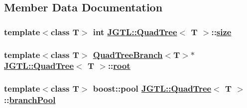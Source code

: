 \subsection{Member Data Documentation}
\hypertarget{class_j_g_t_l_1_1_quad_tree_2e563e76183a1561d6113521465bab13}{
\subsubsection[size]{\setlength{\rightskip}{0pt plus 5cm}template$<$class T$>$ int \hyperlink{class_j_g_t_l_1_1_quad_tree}{JGTL::Quad\-Tree}$<$ T $>$::\hyperlink{class_j_g_t_l_1_1_quad_tree_2e563e76183a1561d6113521465bab13}{size}}}
\label{class_j_g_t_l_1_1_quad_tree_2e563e76183a1561d6113521465bab13}


\hypertarget{class_j_g_t_l_1_1_quad_tree_e93f0860bc8a5fca178cbdc3bc8214d8}{
\subsubsection[root]{\setlength{\rightskip}{0pt plus 5cm}template$<$class T$>$ \hyperlink{class_j_g_t_l_1_1_quad_tree_branch}{Quad\-Tree\-Branch}$<$T$>$$\ast$ \hyperlink{class_j_g_t_l_1_1_quad_tree}{JGTL::Quad\-Tree}$<$ T $>$::\hyperlink{class_j_g_t_l_1_1_quad_tree_e93f0860bc8a5fca178cbdc3bc8214d8}{root}}}
\label{class_j_g_t_l_1_1_quad_tree_e93f0860bc8a5fca178cbdc3bc8214d8}


\hypertarget{class_j_g_t_l_1_1_quad_tree_47cf98740d4640c0fbc23780aa377ff5}{
\subsubsection[branchPool]{\setlength{\rightskip}{0pt plus 5cm}template$<$class T$>$ boost::pool \hyperlink{class_j_g_t_l_1_1_quad_tree}{JGTL::Quad\-Tree}$<$ T $>$::\hyperlink{class_j_g_t_l_1_1_quad_tree_47cf98740d4640c0fbc23780aa377ff5}{branch\-Pool}}}
\label{class_j_g_t_l_1_1_quad_tree_47cf98740d4640c0fbc23780aa377ff5}


